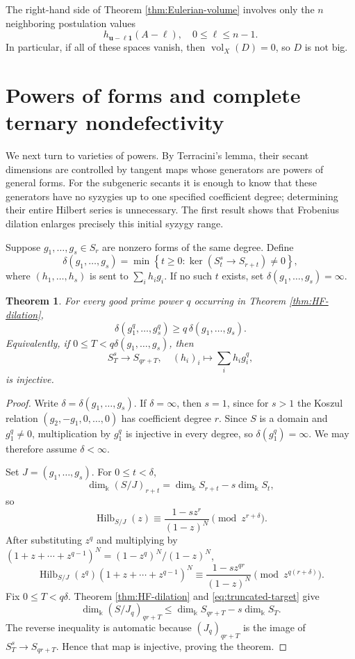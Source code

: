 \documentclass[11pt]{amsart}
\newtheorem{theorem}{Theorem}[section]
\theoremstyle{remark}
\newcommand{\kk}{\Bbbk}
\newcommand{\Hilb}{\operatorname{Hilb}}
\newcommand{\vol}{\operatorname{vol}}
\begin{document}
The right-hand side of Theorem \ref{thm:Eulerian-volume} involves only the $n$ neighboring postulation values
$$
h_{\mathbf u-\ell\mathbf1}(A-\ell),
\quad 0\le\ell\le n-1.
$$
In particular, if all of these spaces vanish, then $\vol_X(D)=0$, so $D$ is not big.




\section{Powers of forms and complete ternary nondefectivity}\label{sec:syzygies}

We next turn to varieties of powers. By Terracini's lemma, their secant dimensions are controlled by tangent maps whose generators are powers of general forms. For the subgeneric secants it is enough to know that these generators have no syzygies up to one specified coefficient degree; determining their entire Hilbert series is unnecessary. The first result shows that Frobenius dilation enlarges precisely this initial syzygy range.

Suppose $g_1,\ldots,g_s\in S_r$ are nonzero forms of the same degree. Define
$$
\delta(g_1,\ldots,g_s)
=
\min\left\{t\ge0:\ker\left(S_t^s\longrightarrow S_{r+t}\right)\ne0\right\},
$$
where $(h_1,\ldots,h_s)$ is sent to $\sum_i h_ig_i$. If no such $t$ exists, set $\delta(g_1,\ldots,g_s)=\infty$.

\begin{theorem}\label{thm:syzygy-gap}
For every good prime power $q$ occurring in Theorem \ref{thm:HF-dilation},
\begin{equation}\label{eq:syzygy-gap}
\delta(g_1^q,\ldots,g_s^q)
\ge
q\,\delta(g_1,\ldots,g_s).
\end{equation}
Equivalently, if $0\le T<q\delta(g_1,\ldots,g_s)$, then
$$
S_T^s\longrightarrow S_{qr+T},
\quad
(h_i)_i\longmapsto\sum_i h_i g_i^q,
$$
is injective.
\end{theorem}

\begin{proof}
Write $\delta=\delta(g_1,\ldots,g_s)$. If $\delta=\infty$, then $s=1$, since for $s>1$ the Koszul relation $(g_2,-g_1,0,\ldots,0)$ has coefficient degree $r$. Since $S$ is a domain and $g_1^q\ne0$, multiplication by $g_1^q$ is injective in every degree, so $\delta(g_1^q)=\infty$. We may therefore assume $\delta<\infty$.

Set $J=(g_1,\ldots,g_s)$. For $0\le t<\delta$,
$$
\dim_{\kk}(S/J)_{r+t}=\dim_{\kk}S_{r+t}-s\dim_{\kk}S_t,
$$
so
$$
\Hilb_{S/J}(z)
\equiv
\frac{1-sz^r}{(1-z)^N}
\pmod{z^{r+\delta}}.
$$
After substituting $z^q$ and multiplying by $(1+z+\cdots+z^{q-1})^N=(1-z^q)^N/(1-z)^N$,
\begin{equation}\label{eq:truncated-target}
\Hilb_{S/J}(z^q)(1+z+\cdots+z^{q-1})^N
\equiv
\frac{1-sz^{qr}}{(1-z)^N}
\pmod{z^{q(r+\delta)}}.
\end{equation}
Fix $0\le T<q\delta$. Theorem \ref{thm:HF-dilation} and \eqref{eq:truncated-target} give
$$
\dim_{\kk}(S/J_q)_{qr+T}
\le
\dim_{\kk}S_{qr+T}-s\dim_{\kk}S_T.
$$
The reverse inequality is automatic because $(J_q)_{qr+T}$ is the image of $S_T^s\to S_{qr+T}$. Hence that map is injective, proving the theorem.
\end{proof}
\end{document}
